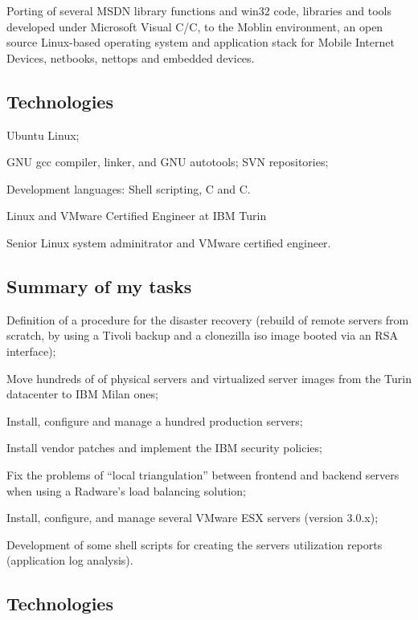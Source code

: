 \noindent
Porting of several MSDN library functions and win32 code, libraries and tools
developed under Microsoft Visual C/C\plusplus, to the Moblin environment,
an open source Linux-based operating system and application stack for
Mobile Internet Devices, netbooks, nettops and embedded devices.

\subsection{Technologies}

\item{\bdot} Ubuntu Linux;
\item{\bdot} GNU gcc compiler, linker, and GNU autotools; SVN repositories;
\item{\bdot} Development languages: Shell scripting, C and C\plusplus.

\bigskip
{}
   {Linux and VMware Certified Engineer at IBM Turin}

\noindent
Senior Linux system adminitrator and VMware certified engineer.

\subsection{Summary of my tasks}

\item{\bdot} Definition of a procedure for the disaster recovery 
   (rebuild of remote servers from scratch, by using a Tivoli backup and a 
    clonezilla iso image booted via an RSA interface);
\item{\bdot} Move hundreds of of physical servers and virtualized server 
   images from the Turin datacenter to IBM Milan ones;
\item{\bdot} Install, configure and manage a hundred production servers;
\item{\bdot} Install vendor patches and implement the IBM security policies;
\item{\bdot} Fix the problems of ``local triangulation'' between frontend 
   and backend servers when using a Radware's load balancing solution;
\item{\bdot} Install, configure, and manage several VMware ESX servers 
   (version 3.0.x);
\item{\bdot} Development of some shell scripts for creating the servers 
   utilization reports (application log analysis).

\subsection{Technologies}

